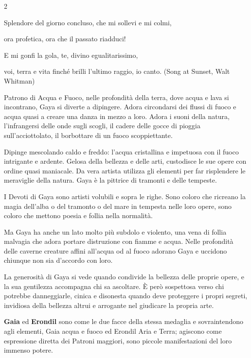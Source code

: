 \begin{multicols}{2}
\begin{enfasi}{
{Splendore del giorno concluso, che mi sollevi e mi colmi,

ora profetica, ora che il passato riadduci!

E mi gonfi la gola, te, divino egualitarissimo,

voi, terra e vita finché brilli l'ultimo raggio, io canto. (Song at Sunset, Walt Whitman)}
}\end{enfasi}

Patrono di Acqua e Fuoco, nelle profondità della terra, dove acqua e lava si incontrano, Gaya si diverte a dipingere. Adora circondarsi dei flussi di fuoco e acqua quasi a creare una danza in mezzo a loro. Adora i suoni della natura, l'infrangersi delle onde sugli scogli, il cadere delle gocce di pioggia sull'acciottolato, il borbottare di un fuoco scoppiettante.

Dipinge mescolando caldo e freddo: l'acqua cristallina e impetuosa con il fuoco intrigante e ardente. Gelosa della bellezza e delle arti, custodisce le sue opere con ordine quasi maniacale. Da vera artista utilizza gli elementi per far risplendere le meraviglie della natura. Gaya è la pittrice di tramonti e delle tempeste.

I Devoti di Gaya sono artisti volubili e sopra le righe. Sono coloro che ricreano la magia dell'alba o del tramonto o del mare in tempesta nelle loro opere, sono coloro che mettono poesia e follia nella normalità.

Ma Gaya ha anche un lato molto più subdolo e violento, una vena di follia malvagia che adora portare distruzione con fiamme e acqua. Nelle profondità delle caverne creature affini all'acqua od al fuoco adorano Gaya e uccidono chiunque non sia d'accordo con loro.

La generosità di Gaya si vede quando condivide la bellezza delle proprie opere, e la sua gentilezza accompagna chi sa ascoltare. È però sospettosa verso chi potrebbe danneggiarle, cinica e disonesta quando deve proteggere i propri segreti, invidiosa della bellezza altrui e arrogante nel giudicare la propria arte.

\begin{narratore}
\textbf{Gaia} ed \textbf{Erondil} sono come le due facce della stessa medaglia e sovraintendono agli elementi, Gaia acqua e fuoco ed Erondil Aria e Terra; agiscono come espressione diretta dei Patroni maggiori, sono piccole manifestazioni del loro immenso potere.
\end{narratore}


\end{multicols}
